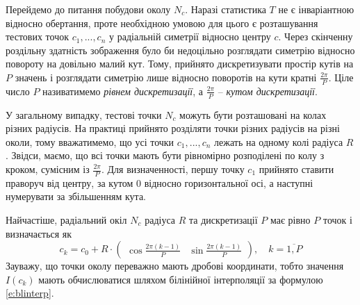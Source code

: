 Перейдемо до питання побудови околу $N_c$. 
Наразі статистика $T$ не є інваріантною відносно обертання, проте необхідною умовою для цього є розташування тестових точок $c_1,...,c_n$ у 
радіальній симетрії відносно центру $c$.
Через скінченну роздільну здатність зображення було би недоцільно розглядати симетрію відносно повороту на довільно малий кут.
Тому, прийнято дискретизувати простір кутів на $P$ значень і розглядати симетрію лише відносно поворотів на кути кратні $\frac{2\pi}{P}$.
Ціле число $P$ називатимемо \emph{рівнем дискретизації}, а $\frac{2\pi}{P}$ -- \emph{кутом дискретизації}. 

У загальному випадку, тестові точки $N_c$ можуть бути розташовані на колах різних радіусів. 
На практиці прийнято розділяти точки різних радіусів на різні околи, тому вважатимемо, що усі точки $c_1,...,c_n$ лежать на одному колі радіуса $R$.
Звідси, маємо, що всі точки мають бути рівномірно розподілені по колу з кроком, сумісним із $\frac{2\pi}{P}$.
Для визначенності, першу точку $c_1$ прийнято ставити праворуч від центру, за кутом 0 відносно горизонтальної осі, а наступні нумерувати за збільшенням кута.

Найчастіше, радіальний окіл $N_c$ радіуса $R$ та дискретизації $P$ має рівно $P$ точок і визначається як
\begin{equation}\label{e:circle}
    c_k = c_0 + R \cdot \begin{pmatrix} \cos \frac{2\pi (k-1)}{P} & \sin \frac{2\pi (k-1)}{P} \end{pmatrix}, \quad k=\overline{1,P}
\end{equation}
Зауважу, що точки околу переважно мають дробові координати, тобто значення $I(c_k)$ мають обчислюватися шляхом білінійної інтерполяції за формулою \ref{e:blinterp}.

